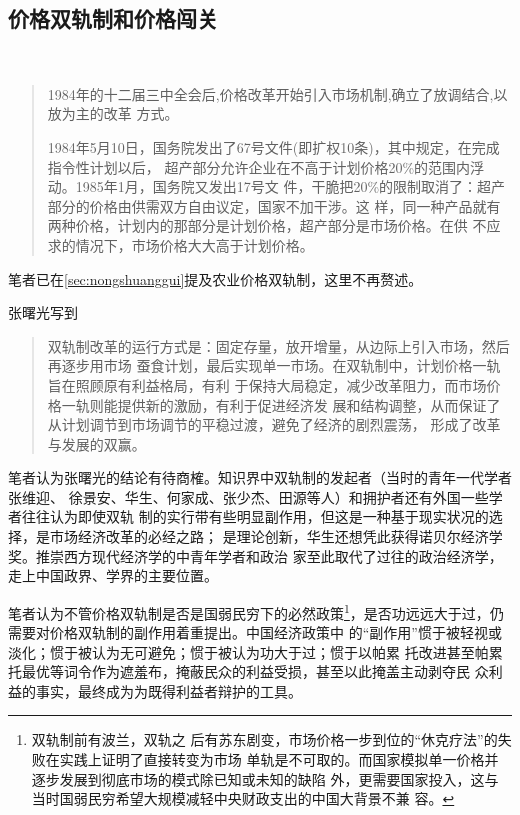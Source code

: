 
\subsection{价格双轨制和价格闯关}
\label{sec:qishuanggui}
　
\begin{quotation}
  1984年的十二届三中全会后,价格改革开始引入市场机制,确立了放调结合,以放为主的改革
  方式。\cite{wangqiangshehui}

  1984年5月10日，国务院发出了67号文件(即扩权10条)，其中规定，在完成指令性计划以后，
  超产部分允许企业在不高于计划价格20\%的范围内浮动。1985年1月，国务院又发出17号文
  件，干脆把20\%的限制取消了：超产部分的价格由供需双方自由议定，国家不加干涉。这
  样，同一种产品就有两种价格，计划内的那部分是计划价格，超产部分是市场价格。在供
  不应求的情况下，市场价格大大高于计划价格。\cite{yangshuanggui}
\end{quotation}

笔者已在\cref{sec:nongshuanggui}提及农业价格双轨制，这里不再赘述。

张曙光写到
\begin{quotation}
  双轨制改革的运行方式是：固定存量，放开增量，从边际上引入市场，然后再逐步用市场
  蚕食计划，最后实现单一市场。在双轨制中，计划价格一轨旨在照顾原有利益格局，有利
  于保持大局稳定，减少改革阻力，而市场价格一轨则能提供新的激励，有利于促进经济发
  展和结构调整，从而保证了从计划调节到市场调节的平稳过渡，避免了经济的剧烈震荡，
  形成了改革与发展的双赢。
\end{quotation}

笔者认为张曙光的结论有待商榷。知识界中双轨制的发起者（当时的青年一代学者张维迎、
徐景安、华生、何家成、张少杰、田源等人）和拥护者还有外国一些学者往往认为即使双轨
制的实行带有些明显副作用，但这是一种基于现实状况的选择，是市场经济改革的必经之路；
是理论创新，华生还想凭此获得诺贝尔经济学奖。推崇西方现代经济学的中青年学者和政治
家至此取代了过往的政治经济学，走上中国政界、学界的主要位置。

笔者认为不管价格双轨制是否是国弱民穷下的必然政策\footnote{双轨制前有波兰，双轨之
  后有苏东剧变，市场价格一步到位的“休克疗法”的失败在实践上证明了直接转变为市场
  单轨是不可取的。而国家模拟单一价格并逐步发展到彻底市场的模式除已知或未知的缺陷
  外，更需要国家投入，这与当时国弱民穷希望大规模减轻中央财政支出的中国大背景不兼
  容。}，是否功远远大于过，仍需要对价格双轨制的副作用着重提出。中国经济政策中
的“副作用”惯于被轻视或淡化；惯于被认为无可避免；惯于被认为功大于过；惯于以帕累
托改进甚至帕累托最优等词令作为遮羞布，掩蔽民众的利益受损，甚至以此掩盖主动剥夺民
众利益的事实，最终成为为既得利益者辩护的工具。

